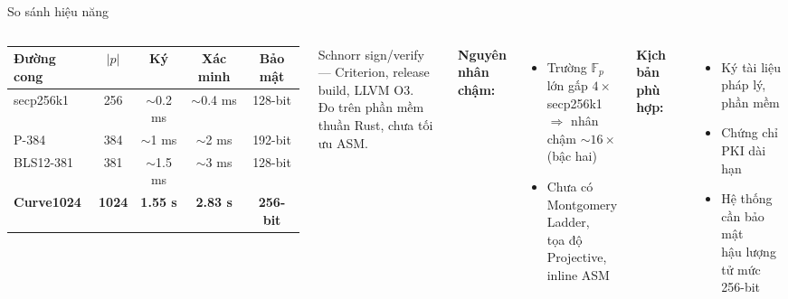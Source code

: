 \begin{frame}{So sánh hiệu năng}
  \begin{columns}[T]
      {\footnotesize
      \begin{tabular}{@{}lcccc@{}}
        \toprule
        Đường cong & $|p|$ & Ký & Xác minh & Bảo mật \\
        \midrule
        secp256k1 & 256 & $\sim$0.2 ms & $\sim$0.4 ms & 128-bit \\
        P-384 & 384 & $\sim$1 ms & $\sim$2 ms & 192-bit \\
        BLS12-381 & 381 & $\sim$1.5 ms & $\sim$3 ms & 128-bit \\
        \midrule
        \textbf{Curve1024} & \textbf{1024} & \textbf{1.55 s} & \textbf{2.83 s} & \textbf{256-bit} \\
        \bottomrule
      \end{tabular}
      }
      \vspace{0.3em}

      {\footnotesize
        Schnorr sign/verify --- Criterion, release build, LLVM O3.\\
        Đo trên phần mềm thuần Rust, chưa tối ưu ASM.
      }

      \textbf{Nguyên nhân chậm:}
      \begin{itemize}
        \small
        \item Trường $\mathbb{F}_p$ lớn gấp $4\times$ secp256k1\\
              $\Rightarrow$ nhân chậm $\sim$$16\times$ (bậc hai)
        \item Chưa có Montgomery Ladder,\\tọa độ Projective, inline ASM
      \end{itemize}
      \vspace{0.3em}
      \textbf{Kịch bản phù hợp:}
      \begin{itemize}
        \small
        \item Ký tài liệu pháp lý, phần mềm
        \item Chứng chỉ PKI dài hạn
        \item Hệ thống cần bảo mật\\hậu lượng tử mức 256-bit
      \end{itemize}
  \end{columns}
\end{frame}
